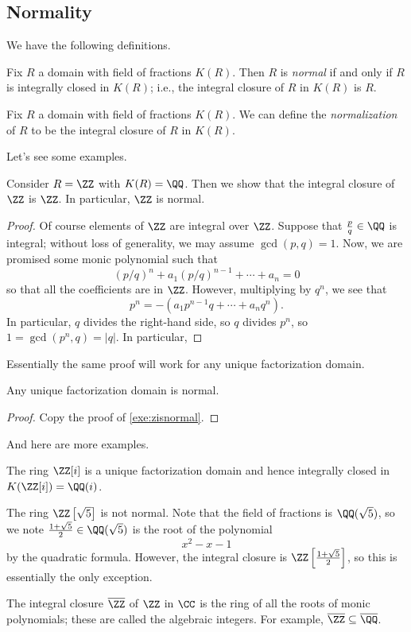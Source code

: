 \subsection{Normality}
We have the following definitions.
\begin{definition}[Normal]
	Fix $R$ a domain with field of fractions $K(R)$. Then $R$ is \textit{normal} if and only if $R$ is integrally closed in $K(R)$; i.e., the integral closure of $R$ in $K(R)$ is $R$.
\end{definition}
\begin{definition}[Normalization]
	Fix $R$ a domain with field of fractions $K(R)$. We can define the \textit{normalization} of $R$ to be the integral closure of $R$ in $K(R)$.
\end{definition}
Let's see some examples.
\begin{exe} \label{exe:zisnormal}
	Consider $R=\ZZ$ with $K(R)=\QQ$. Then we show that the integral closure of $\ZZ$ is $\ZZ$. In particular, $\ZZ$ is normal.
\end{exe}
\begin{proof}
	Of course elements of $\ZZ$ are integral over $\ZZ$. Suppose that $\frac pq\in\QQ$ is integral; without loss of generality, we may assume $\gcd(p,q)=1$. Now, we are promised some monic polynomial such that
	\[(p/q)^n+a_1(p/q)^{n-1}+\cdots+a_n=0\]
	so that all the coefficients are in $\ZZ$. However, multiplying by $q^n$, we see that
	\[p^n=-\left(a_1p^{n-1}q+\cdots+a_nq^n\right).\]
	In particular, $q$ divides the right-hand side, so $q$ divides $p^n$, so $1=\gcd(p^n,q)=|q|$. In particular, 
\end{proof}
Essentially the same proof will work for any unique factorization domain.
\begin{proposition}
	Any unique factorization domain is normal.
\end{proposition}
\begin{proof}
	Copy the proof of \autoref{exe:zisnormal}.
\end{proof}
And here are more examples.
\begin{example}
	The ring $\ZZ[i]$ is a unique factorization domain and hence integrally closed in $K(\ZZ[i])=\QQ(i)$.
\end{example}
\begin{nex}
	The ring $\ZZ\left[\sqrt5\right]$ is not normal. Note that the field of fractions is $\QQ(\sqrt5)$, so we note $\frac{1+\sqrt5}2\in\QQ(\sqrt5)$ is the root of the polynomial
	\[x^2-x-1\]
	by the quadratic formula. However, the integral closure is $\ZZ\left[\frac{1+\sqrt5}2\right]$, so this is essentially the only exception.
\end{nex}
\begin{example}
	The integral closure $\overline\ZZ$ of $\ZZ$ in $\CC$ is the ring of all the roots of monic polynomials; these are called the algebraic integers. For example, $\overline\ZZ\subseteq\overline\QQ$.
\end{example}

